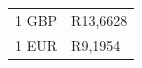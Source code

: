 {\begin{tabular}[t]{|l|l|}
    
        1 GBP &
    
    
        R13,6628%
     \tabularnewline\cline{1-1}\cline{2-2}
    
    
        1 EUR &
    
    
        R9,1954%
     \tabularnewline\cline{1-1}\cline{2-2}
    \end{tabular}} %
        \addtolength{\mytableboxheight}{\mytableboxdepth}
        \addtocounter{footnote}{-0}
        
